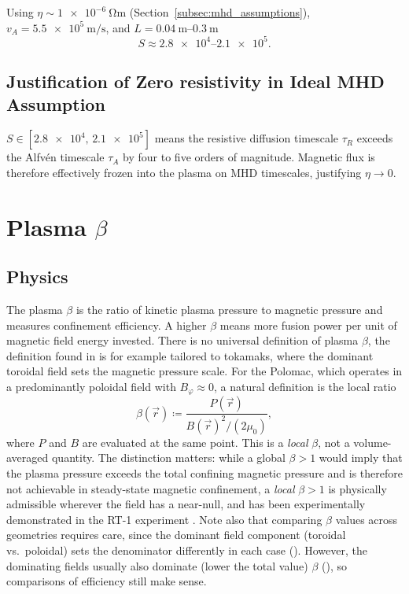 Using $\eta\sim\SI{1e-6}{\ohm\metre}$ (Section~\ref{subsec:mhd_assumptions}),
$v_A=\SI{5.5e5}{\metre\per\second}$, and $L=\SIrange{0.04}{0.3}{\metre}$
\[
    S \approx \numrange{2.8e4}{2.1e5}.
\]


\subsection*{Justification of Zero resistivity in Ideal MHD Assumption}

$S \in [\num{2.8e4},\, \num{2.1e5}]$ means the resistive diffusion
timescale $\tau_R$ exceeds the Alfv\'en timescale $\tau_A$ by four to
five orders of magnitude. Magnetic flux is therefore effectively frozen
into the plasma on MHD timescales, justifying $\eta\to 0$.




\section{Plasma \texorpdfstring{$\beta$}{Beta}}
\label{sec:beta}

\subsection{Physics}

The plasma $\beta$ is the ratio of kinetic plasma pressure to magnetic
pressure and measures confinement efficiency. A higher $\beta$ means more fusion
power per unit of magnetic field energy invested.
There is no universal definition of plasma $\beta$, the definition found in
\cite{Freidberg2014} is for example tailored to tokamaks, where the dominant
toroidal field sets the magnetic pressure scale.
For the Polomac, which operates in a predominantly poloidal field with $B_\varphi
\approx 0$, a natural definition is the local ratio
\begin{equation}
    \beta(\vec{r}) \coloneqq \frac{P(\vec{r})}{B(\vec{r})^2/(2\mu_0)},
    \label{eq:beta}
\end{equation}
where $P$ and $B$ are evaluated at the same point. This is a \emph{local} $\beta$,
not a volume-averaged quantity. The distinction matters: while a global
$\beta > 1$ would imply that the plasma pressure exceeds the total confining
magnetic pressure and is therefore not achievable in steady-state magnetic
confinement, a \emph{local} $\beta > 1$ is physically admissible wherever the
field has a near-null, and has been experimentally demonstrated in the RT-1
 experiment \cite{Nishiura2015}.
Note also that comparing $\beta$ values across geometries requires care, since the
dominant field component (toroidal vs.\ poloidal) sets the denominator differently
in each case (\cite{Freidberg2014}).
However, the dominating fields usually also dominate (lower the total value) $\beta$ (\cite{Freidberg2014}),
so comparisons of efficiency still make sense.

